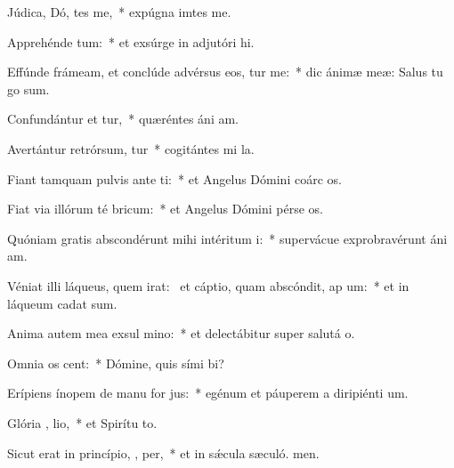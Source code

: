 \item Júdica, Dó, tes me,~* expúgna imtes me.
\item Apprehénde   tum:~* et exsúrge in adjutóri hi.
\item Effúnde frámeam, et conclúde advérsus eos,  tur me:~* dic ánimæ meæ: Salus tu go sum.
\item Confundántur et tur,~* quæréntes áni am.
\item Avertántur retrórsum,  tur~* cogitántes mi la.
\item Fiant tamquam pulvis ante  ti:~* et Angelus Dómini coárc os.
\item Fiat via illórum té  bricum:~* et Angelus Dómini pérse os.
\item Quóniam gratis abscondérunt mihi intéritum  i:~* supervácue exprobravérunt áni am.
\item Véniat illi láqueus, quem irat:~\pscross{} et cáptio, quam abscóndit, ap um:~* et in láqueum cadat  sum.
\item Anima autem mea exsul  mino:~* et delectábitur super salutá o.
\item Omnia os  cent:~* Dómine, quis sími bi?
\item Erípiens ínopem de manu for jus:~* egénum et páuperem a diripiénti um.
\item Glória ,  lio,~* et Spirítu to.
\item Sicut erat in princípio,  ,  per,~* et in sǽcula sæculó. men.
